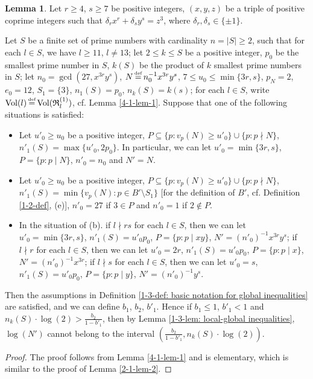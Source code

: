 \documentclass[a4paper, 12pt]{article}
\DeclareMathOperator{\defeq}{\overset{\text{\tiny{def}}}{=}}
\DeclareMathOperator{\Vol}{\text{Vol}}
\numberwithin{equation}{section}
\theoremstyle{definition}
\newtheorem{lem}[thm]{Lemma}
\begin{document}
\begin{lem}  \label{4-1-lem-2}
Let $r \ge 4$, $s\ge 7$ be positive integers, $(x,y,z)$ be a triple of positive coprime integers such that $\delta_r x^r + \delta_s y^s = z^3$, where $\delta_r,\delta_s \in \{\pm 1\}$. 

Let $S$ be a finite set of prime numbers with cardinality $n = |S| \ge 2$, such that for each $l\in S$, we have $l \ge 11$, $l\neq 13$;
let $2\le k\le S$ be a positive integer, $p_0$ be the smallest prime number in $S$, $k(S)$ be the product of $k$ smallest prime numbers in $S$;
let $n_0 = \gcd(27, x^{3r} y^s)$, $N \defeq n_0^{-1} x^{3r} y^s$, $7 \le u_0 \le \min\{3r, s\}$, $p_N = 2$, $e_0 = 12$, $S_1 = \{3\}$, $n_1(S) = p_0$, $n_k(S) = k(s)$;
for each $l\in S$, write $\Vol(l)\defeq \Vol(\mathfrak R_l^{(1)})$, cf. Lemma \ref{4-1-lem-1}.
Suppose that one of the following situations is satisfied:

\begin{itemize}
\item [(a)] Let $u'_0 \ge u_0$ be a positive integer, $P\subseteq \{p: v_p(N) \ge u'_0 \} \cup \{p: p\nmid N\}$, $n'_1(S) = \max\{u'_0, 2p_0\}$.
In particular, we can let $u'_0 = \min\{3r, s\}$, $P = \{p: p\mid N\}$, $n'_0 = n_0$ and $N' = N$.

\item [(b)] Let $u'_0 \ge u_0$ be a positive integer, $P\subseteq \{p: v_p(N) \ge u'_0 \} \cup \{p: p\nmid N\}$, $n'_1(S) = \min\{v_p(N): p\in B'\setminus S_1\}$ [for the definition of $B'$, cf. Definition \ref{1-2-def}, (e)], $n'_0 = 27$ if $3\in P$ and $n'_0 = 1$ if $2\notin P$.

\item [(c)] In the situation of (b).
if $l\nmid rs$ for each $l\in S$, then we can let $u'_0 = \min\{3r, s\}$, $n'_1(S) = u'_0 p_0$, $P=\{p: p\mid xy\}$, $N' = (n'_0)^{-1} x^{3r} y^{s}$;
if $l\nmid r$ for each $l\in S$, then we can let $u'_0 = 2r$, $n'_1(S) = u'_0 p_0$, $P=\{p: p\mid x\}$, $N' = (n'_0)^{-1} x^{3r}$;
if $l\nmid s$ for each $l\in S$, then we can let $u'_0 = s$, $n'_1(S) = u'_0 p_0$, $P=\{p: p\mid y\}$, $N' = (n'_0)^{-1} y^{s}$.
\end{itemize}

Then the assumptions in Definition \ref{1-3-def: basic notation for global inequalities} are satisfied, and we can define $b_1$, $b_2$, $b'_1$. 
Hence if $b_1 \le  1$, $b'_1 < 1$ and $n_k(S)\cdot \log(2) > \frac{b_2}{1-b'_1}$, then by Lemma \ref{1-3-lem: local-global inequalities}, $\log(N')$ cannot belong to the interval $(\frac{b_2}{1-b'_1}, n_k(S)\cdot \log(2) ) .$
\end{lem}
\begin{proof}
The proof follows from Lemma \ref{4-1-lem-1} and is elementary, which is similar to the proof of Lemma \ref{2-1-lem-2}.
\end{proof}
\end{document}
